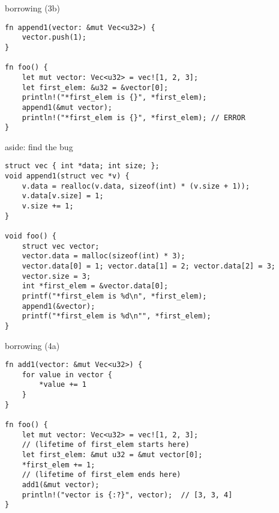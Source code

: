 \begin{frame}[fragile,label=rustBorrowing3b]{borrowing (3b)}
\begin{verbatim}
fn append1(vector: &mut Vec<u32>) {
    vector.push(1);
}

fn foo() {
    let mut vector: Vec<u32> = vec![1, 2, 3];
    let first_elem: &u32 = &vector[0];
    println!("*first_elem is {}", *first_elem);
    append1(&mut vector);
    println!("*first_elem is {}", *first_elem); // ERROR
}
\end{verbatim}
\end{frame}

\begin{frame}[fragile,label=rustBorrwing3AsC]{aside: find the bug}
\begin{lstlisting}[style=script]
struct vec { int *data; int size; };
void append1(struct vec *v) {
    v.data = realloc(v.data, sizeof(int) * (v.size + 1));
    v.data[v.size] = 1;
    v.size += 1;
}

void foo() {
    struct vec vector;
    vector.data = malloc(sizeof(int) * 3);
    vector.data[0] = 1; vector.data[1] = 2; vector.data[2] = 3;
    vector.size = 3;
    int *first_elem = &vector.data[0];
    printf("*first_elem is %d\n", *first_elem);
    append1(&vector);
    printf("*first_elem is %d\n"", *first_elem);
}
\end{lstlisting}
\end{frame}

\begin{frame}[fragile,label=rustBorrowing4a]{borrowing (4a)}
\begin{verbatim}
fn add1(vector: &mut Vec<u32>) {
    for value in vector {
        *value += 1
    }
}

fn foo() {
    let mut vector: Vec<u32> = vec![1, 2, 3];
    // (lifetime of first_elem starts here)
    let first_elem: &mut u32 = &mut vector[0];
    *first_elem += 1;
    // (lifetime of first_elem ends here)
    add1(&mut vector);
    println!("vector is {:?}", vector);  // [3, 3, 4]
}
\end{verbatim}
\end{frame}

